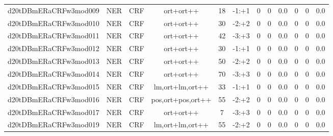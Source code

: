 \documentclass[a4paper]{article}
\begin{document}
\begin{landscape}
\begin{center}
\begin{tabular}{ |c|c|c|c|c|c|c|c|c|c|c|c|}
 
 	
 	\small{ d20tDBmERaCRFw3mod009 } & \small{ NER} & \small{  CRF }  & ort+ort++  &  18 &  \small{  -1:+1 }  &  0 & 0 & 0.0  &  0 & 0 & 0.0 \\
 	

 
 	
 	\small{ d20tDBmERaCRFw3mod010 } & \small{ NER} & \small{  CRF }  & ort+ort++  &  30 &  \small{  -2:+2 }  &  0 & 0 & 0.0  &  0 & 0 & 0.0 \\
 	

 
 	
 	\small{ d20tDBmERaCRFw3mod011 } & \small{ NER} & \small{  CRF }  & ort+ort++  &  42 &  \small{  -3:+3 }  &  0 & 0 & 0.0  &  0 & 0 & 0.0 \\
 	

 
 	
 	\small{ d20tDBmERaCRFw3mod012 } & \small{ NER} & \small{  CRF }  & ort+ort++  &  30 &  \small{  -1:+1 }  &  0 & 0 & 0.0  &  0 & 0 & 0.0 \\
 	

 
 	
 	\small{ d20tDBmERaCRFw3mod013 } & \small{ NER} & \small{  CRF }  & ort+ort++  &  50 &  \small{  -2:+2 }  &  0 & 0 & 0.0  &  0 & 0 & 0.0 \\
 	

 
 	
 	\small{ d20tDBmERaCRFw3mod014 } & \small{ NER} & \small{  CRF }  & ort+ort++  &  70 &  \small{  -3:+3 }  &  0 & 0 & 0.0  &  0 & 0 & 0.0 \\
 	

 
 	
 	\small{ d20tDBmERaCRFw3mod015 } & \small{ NER} & \small{  CRF }  & lm,ort+lm,ort++  &  33 &  \small{  -1:+1 }  &  0 & 0 & 0.0  &  0 & 0 & 0.0 \\
 	

 
 	
 	\small{ d20tDBmERaCRFw3mod016 } & \small{ NER} & \small{  CRF }  & pos,ort+pos,ort++  &  55 &  \small{  -2:+2 }  &  0 & 0 & 0.0  &  0 & 0 & 0.0 \\
 	

 
 	
 	\small{ d20tDBmERaCRFw3mod017 } & \small{ NER} & \small{  CRF }  & ort+ort++  &  7 &  \small{  -3:+3 }  &  0 & 0 & 0.0  &  0 & 0 & 0.0 \\
 	

 
 	
 	\small{ d20tDBmERaCRFw3mod019 } & \small{ NER} & \small{  CRF }  & lm,ort+lm,ort++  &  55 &  \small{  -2:+2 }  &  0 & 0 & 0.0  &  0 & 0 & 0.0 \\
 	


\end{tabular}
\end{center}
\end{landscape}
\end{document}
